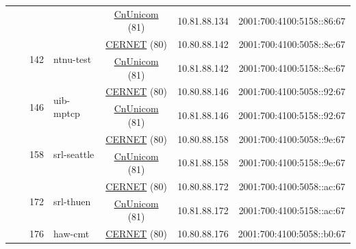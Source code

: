 \begin{small}
\begin{center}
\begin{longtable}{|c|c|c|c|c|c|c|c|}
  &  &  &  & \multicolumn{2}{|c|}{\tiny{\href{http://www.chinaunicom.com}{CnUnicom} (81)}} & \tiny{10.81.88.134} & \tiny{2001:700:4100:5158::86:67} \\* \cline{3-3}\cline{4-4}\cline{5-5}\cline{6-6}\cline{7-7}\cline{8-8}
  &  & \multirow{2}{*}{\tiny{142}} & \multicolumn{1}{|l|}{\multirow{2}{*}{\tiny{ntnu-test}}} & \multicolumn{2}{|c|}{\tiny{\href{http://www.cernet.edu.cn}{CERNET} (80)}} & \tiny{10.80.88.142} & \tiny{2001:700:4100:5058::8e:67} \\* \cline{5-5}\cline{6-6}\cline{7-7}\cline{8-8}
  &  &  &  & \multicolumn{2}{|c|}{\tiny{\href{http://www.chinaunicom.com}{CnUnicom} (81)}} & \tiny{10.81.88.142} & \tiny{2001:700:4100:5158::8e:67} \\* \cline{3-3}\cline{4-4}\cline{5-5}\cline{6-6}\cline{7-7}\cline{8-8}
  &  & \multirow{2}{*}{\tiny{146}} & \multicolumn{1}{|l|}{\multirow{2}{*}{\tiny{uib-mptcp}}} & \multicolumn{2}{|c|}{\tiny{\href{http://www.cernet.edu.cn}{CERNET} (80)}} & \tiny{10.80.88.146} & \tiny{2001:700:4100:5058::92:67} \\* \cline{5-5}\cline{6-6}\cline{7-7}\cline{8-8}
  &  &  &  & \multicolumn{2}{|c|}{\tiny{\href{http://www.chinaunicom.com}{CnUnicom} (81)}} & \tiny{10.81.88.146} & \tiny{2001:700:4100:5158::92:67} \\* \cline{3-3}\cline{4-4}\cline{5-5}\cline{6-6}\cline{7-7}\cline{8-8}
  &  & \multirow{2}{*}{\tiny{158}} & \multicolumn{1}{|l|}{\multirow{2}{*}{\tiny{srl-seattle}}} & \multicolumn{2}{|c|}{\tiny{\href{http://www.cernet.edu.cn}{CERNET} (80)}} & \tiny{10.80.88.158} & \tiny{2001:700:4100:5058::9e:67} \\* \cline{5-5}\cline{6-6}\cline{7-7}\cline{8-8}
  &  &  &  & \multicolumn{2}{|c|}{\tiny{\href{http://www.chinaunicom.com}{CnUnicom} (81)}} & \tiny{10.81.88.158} & \tiny{2001:700:4100:5158::9e:67} \\* \cline{3-3}\cline{4-4}\cline{5-5}\cline{6-6}\cline{7-7}\cline{8-8}
  &  & \multirow{2}{*}{\tiny{172}} & \multicolumn{1}{|l|}{\multirow{2}{*}{\tiny{srl-thuen}}} & \multicolumn{2}{|c|}{\tiny{\href{http://www.cernet.edu.cn}{CERNET} (80)}} & \tiny{10.80.88.172} & \tiny{2001:700:4100:5058::ac:67} \\* \cline{5-5}\cline{6-6}\cline{7-7}\cline{8-8}
  &  &  &  & \multicolumn{2}{|c|}{\tiny{\href{http://www.chinaunicom.com}{CnUnicom} (81)}} & \tiny{10.81.88.172} & \tiny{2001:700:4100:5158::ac:67} \\* \cline{3-3}\cline{4-4}\cline{5-5}\cline{6-6}\cline{7-7}\cline{8-8}
  &  & \multirow{2}{*}{\tiny{176}} & \multicolumn{1}{|l|}{\multirow{2}{*}{\tiny{haw-cmt}}} & \multicolumn{2}{|c|}{\tiny{\href{http://www.cernet.edu.cn}{CERNET} (80)}} & \tiny{10.80.88.176} & \tiny{2001:700:4100:5058::b0:67} \\* \cline{5-5}\cline{6-6}\cline{7-7}\cline{8-8}

\end{longtable}
\end{center}
\end{small}
